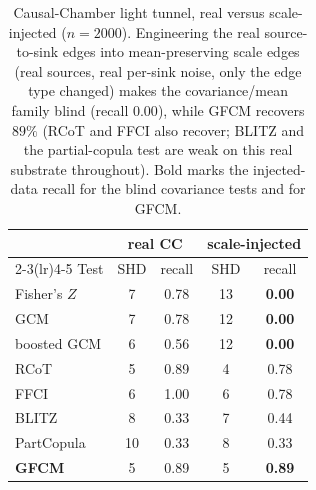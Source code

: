 \begin{table}[ht]\centering
\begin{tabular}{lcccc}
\toprule
 & \multicolumn{2}{c}{real CC} & \multicolumn{2}{c}{scale-injected} \\
\cmidrule(lr){2-3}\cmidrule(lr){4-5}
Test & SHD & recall & SHD & recall \\
\midrule
Fisher's $Z$ & 7 & 0.78 & 13 & \textbf{0.00} \\
GCM & 7 & 0.78 & 12 & \textbf{0.00} \\
boosted GCM & 6 & 0.56 & 12 & \textbf{0.00} \\
RCoT & 5 & 0.89 & 4 & 0.78 \\
FFCI & 6 & 1.00 & 6 & 0.78 \\
BLITZ & 8 & 0.33 & 7 & 0.44 \\
PartCopula & 10 & 0.33 & 8 & 0.33 \\
\textbf{GFCM} & 5 & 0.89 & 5 & \textbf{0.89} \\
\bottomrule
\end{tabular}
\caption{Causal-Chamber light tunnel, real versus scale-injected ($n=2000$). Engineering the real source-to-sink edges into mean-preserving scale edges (real sources, real per-sink noise, only the edge type changed) makes the covariance/mean family blind (recall $0.00$), while GFCM recovers $89\%$ (RCoT and FFCI also recover; BLITZ and the partial-copula test are weak on this real substrate throughout). Bold marks the injected-data recall for the blind covariance tests and for GFCM.}
\label{tab:cc-inject}
\end{table}
